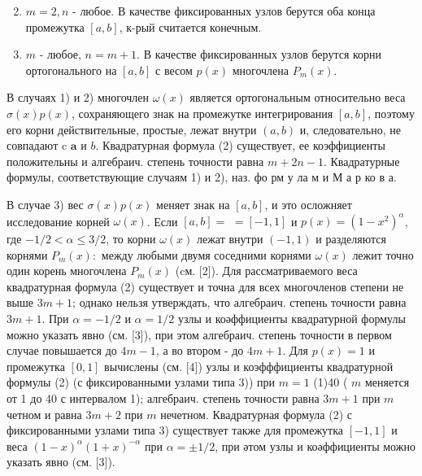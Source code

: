 \documentclass[10pt]{article}
\begin{document}
\begin{enumerate}

  \setcounter{enumi}{1}

  \item $m=2, n$ - любое. В качестве фиксированных узлов берутся оба конца промежутка $[a, b]$, к-рый считается конечным.



  \item $m$ - любое, $n=m+1$. В качестве фиксированных узлов берутся корни ортогонального на $[a, b]$ с весом $p(x)$ многочлена $P_{m}(x)$.



\end{enumerate}



В случаях 1) и 2) многочлен $\omega(x)$ является ортогональным относительно веса $\sigma(x) p(x)$, сохраняющего знак на промежутке интегрирования $[a, b]$, поэтому его корни действительные, простые, лежат внутри $(a, b)$ и, следовательно, не совпадают c $\boldsymbol{a}$ и $b$. Квадратурная формула (2) существует, ее коэффициенты положительны и алгебраич. степень точности равна $m+2 n-1$. Квадратурные формулы, соответствующие случаям 1) и 2), наз. фо рм у ла м и М а р ко в а.



В случае 3) вес $\sigma(x) p(x)$ меняет знак на $[a, b]$, и это осложняет исследование корней $\omega(x)$. Если $[a, b]=$ $=[-1,1]$ и $p(x)=\left(1-x^{2}\right)^{\alpha}$, где $-1 / 2<\alpha \leqslant 3 / 2$, то корни $\omega(x)$ лежат внутри $(-1,1)$ и разделяются корнями $P_{m}(x):$ между любыми двумя соседними корнями $\omega(x)$ лежит точно один корень многочлена $P_{m}(x)$ (cм. [2]). Для рассматриваемого веса квадратурная формула (2) существует и точна для всех многочленов степени не выше $3 m+1$; однако нельзя утверждать, что алгебраич. степень точности равна $3 m+1$. При $\alpha=-1 / 2$ и $\alpha=1 / 2$ узлы и коәффициенты квадратурной формулы можно указать явно (см. [3]), при этом алгебраич. степень точности в первом случае повышается до $4 m-1$, а во втором - до $4 m+1$. Для $p(x)=1$ и промежутка $[0,1]$ вычислены (см. [4]) узлы и коэфффициенты квадратурной формулы (2) (с фиксированными узлами типа 3)) при $m=1$ (1)40 ( $m$ меняется от 1 до 40 с интервалом 1); алгебраич. степень точности равна $3 m+1$ при $m$ четном и равна $3 m+2$ при $m$ нечетном. Квадратурная формула (2) с фиксированными узлами типа 3) существует также для промежутка $[-1,1]$ и веса $(1-x)^{\alpha}(1+x)^{-\alpha}$ при $\alpha= \pm 1 / 2$, при әтом узлы и коәффициенты можно указать явно (см. [3]).
\end{document}
